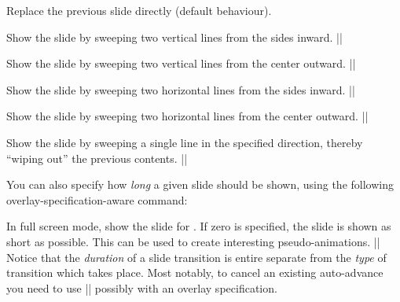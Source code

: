 \begin{command}{\transreplace{}}
  Replace the previous slide directly (default behaviour).
\end{command}

\begin{command}{\transsplitverticalin{}}
  Show the slide by sweeping two vertical lines from the sides inward.
  \example|\transsplitverticalin|
\end{command}

\begin{command}{\transsplitverticalout{}}
  Show the slide by sweeping two vertical lines from the center outward.
  \example|\transsplitverticalout|
\end{command}

\begin{command}{\transsplithorizontalin{}}
  Show the slide by sweeping two horizontal lines from the sides inward.
  \example|\transsplithorizontalin|
\end{command}

\begin{command}{\transsplithorizontalout{}}
  Show the slide by sweeping two horizontal lines from the center outward.
  \example|\transsplithorizontalout|
\end{command}

\begin{command}{\transwipe{}}
  Show the slide by sweeping a single line in the specified direction, thereby ``wiping out'' the previous contents.
  \example|\transwipe[direction=90]|
\end{command}

You can also specify how \emph{long} a given slide should be shown, using the following overlay-specification-aware command:
\begin{command}{\transduration{}}
  In full screen mode, show the slide for . If zero is specified, the slide is shown as short as possible. This can be used to create interesting pseudo-animations.
  \example||
  Notice that the \emph{duration} of a slide transition is entire separate from the \emph{type} of transition which takes place. Most notably, to cancel an existing auto-advance you need to use 
  \example|\transduration{}|
possibly with an overlay specification.
\end{command}
